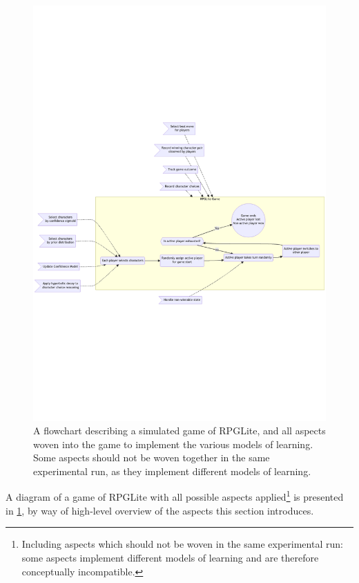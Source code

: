 \begin{figure}
  \centering
  \includegraphics[width=\columnwidth]{50_optimisation_with_aspects/diagrams/aspect_applied_model.png}
  \caption{A flowchart describing a simulated game of RPGLite, and all aspects woven into the game to implement the various models of learning. Some aspects should not be woven together in the same experimental run, as they implement different models of learning.}
  \label{fig:all_aspects_applied}
\end{figure}

A diagram of a game of RPGLite with all possible aspects
applied\footnote{Including aspects which should not be woven in the same
experimental run: some aspects implement different models of learning and are
therefore conceptually incompatible.} is
presented in \cref{fig:all_aspects_applied}, by way of high-level overview of
the aspects this section introduces.


